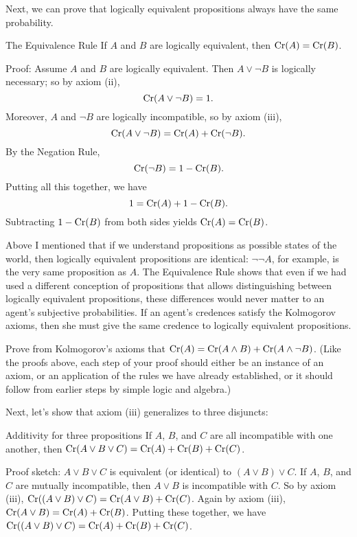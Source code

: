 Next, we can prove that logically equivalent propositions always have
the same probability.

\begin{genericthm}{The Equivalence Rule}
  If $A$ and $B$ are logically equivalent, then $\text{Cr}(A) = \text{Cr}(B)$.
\end{genericthm}
Proof: Assume $A$ and $B$ are logically equivalent. Then $A \lor \neg
B$ is logically necessary; so by axiom (ii),
\[
  \text{Cr}(A \lor \neg B) = 1.
\]
Moreover, $A$ and $\neg B$ are logically incompatible, so by axiom
(iii),
\[
  \text{Cr}(A \lor \neg B) = \text{Cr}(A) + \text{Cr}(\neg B).
\]
By the Negation Rule,
\[
  \text{Cr}(\neg B) = 1-\text{Cr}(B).
\]
Putting all this together, we have
\[
  1 = \text{Cr}(A) + 1 - \text{Cr}(B).
\]
Subtracting $1-\text{Cr}(B)$ from both sides yields $\text{Cr}(A) = \text{Cr}(B)$.

Above I mentioned that if we understand propositions as possible
states of the world, then logically equivalent propositions are
identical: $\neg\neg A$, for example, is the very same proposition as
$A$. The Equivalence Rule shows that even if we had used a different
conception of propositions that allows distinguishing between
logically equivalent propositions, these differences would never
matter to an agent's subjective probabilities. If an agent's credences
satisfy the Kolmogorov axioms, then she must give the same credence to
logically equivalent propositions.

\begin{exercise3}\label{exerc:partition}
  Prove from Kolmogorov's axioms that
  $\text{Cr}(A) = \text{Cr}(A\land B) + \text{Cr}(A \land \neg B)$. (Like the proofs
  above, each step of your proof should either be an instance of an
  axiom, or an application of the rules we have already established,
  or it should follow from earlier steps by simple logic and algebra.)
\end{exercise3}

Next, let's show that axiom (iii) generalizes to three disjuncts:

\begin{genericthm}{Additivity for three propositions}
  If $A$, $B$, and $C$ are all incompatible with one another, then
  $\text{Cr}(A \lor B \lor C) = \text{Cr}(A) + \text{Cr}(B) + \text{Cr}(C)$.
\end{genericthm}
Proof sketch: $A \lor B \lor C$ is equivalent (or identical) to
$(A \lor B) \lor C$. If $A$, $B$, and $C$ are mutually incompatible,
then $A \lor B$ is incompatible with $C$. So by axiom (iii),
$\text{Cr}((A \lor B) \lor C) = \text{Cr}(A \lor B) + \text{Cr}(C)$. Again by axiom
(iii), $\text{Cr}(A \lor B) = \text{Cr}(A) + \text{Cr}(B)$. Putting these together, we
have $\text{Cr}((A \lor B) \lor C) = \text{Cr}(A) + \text{Cr}(B) + \text{Cr}(C)$.


